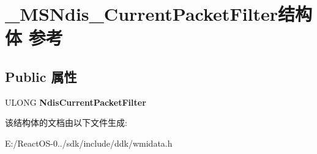 \hypertarget{struct___m_s_ndis___current_packet_filter}{}\section{\+\_\+\+M\+S\+Ndis\+\_\+\+Current\+Packet\+Filter结构体 参考}
\label{struct___m_s_ndis___current_packet_filter}
\subsection*{Public 属性}
\begin{DoxyCompactItemize}
\item 
\mbox{\label{struct___m_s_ndis___current_packet_filter_a134364611ba0b7223473d2d75f078830}} 
U\+L\+O\+NG {\bfseries Ndis\+Current\+Packet\+Filter}
\end{DoxyCompactItemize}


该结构体的文档由以下文件生成\+:\begin{DoxyCompactItemize}
\item 
E\+:/\+React\+O\+S-\/0../sdk/include/ddk/wmidata.\+h\end{DoxyCompactItemize}
